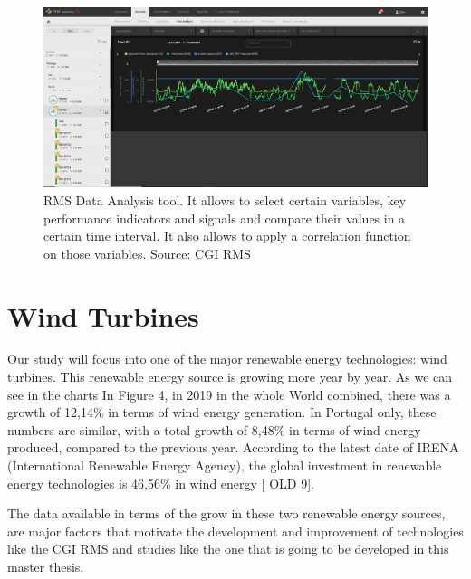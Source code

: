 \begin{figure}[htbp]
	\centering
	\includegraphics[width=\textwidth]{Chapters/Figures/background_fig3.PNG}
	\caption{RMS Data Analysis tool. It allows to select certain variables, key performance indicators and signals and compare their values in a certain time interval. It also allows to apply a correlation function on those variables. Source: CGI RMS}
	\label{fig:Figuras_Tree_silhouettes-vectorial}
\end{figure}


\section{Wind Turbines} 
\label{sub:if_you_use_this_template} 

Our study will focus into one of the major renewable energy technologies: wind turbines. This renewable energy source is growing more year by year. As we can see in the charts In Figure 4, in 2019 in the whole World combined, there was a growth of 12,14\% in terms of wind energy generation. In Portugal only, these numbers are similar, with a total growth of 8,48\% in terms of wind energy produced, compared to the previous year. According to the latest date of IRENA (International Renewable Energy Agency), the global investment in renewable energy technologies is 46,56\% in wind energy [ OLD 9].

The data available in terms of the grow in these two renewable energy sources, are major factors that motivate the development and improvement of technologies like the CGI RMS and studies like the one that is going to be developed in this master thesis.



